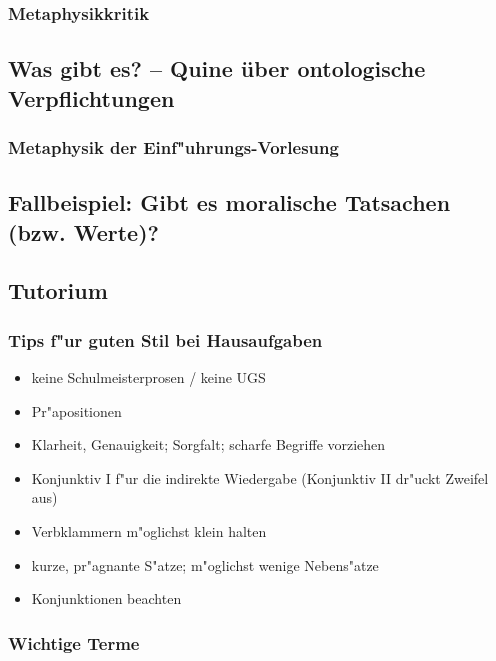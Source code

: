 \documentclass[]{scrartcl}
\begin{document}
\subsubsection{Metaphysikkritik}


\subsection{Was gibt es? -- Quine über ontologische Verpflichtungen}


\subsubsection{Metaphysik der Einf"uhrungs-Vorlesung}



\subsection{Fallbeispiel: Gibt es moralische Tatsachen (bzw. Werte)?}

\subsection{Tutorium}
\subsubsection{Tips f"ur guten Stil bei Hausaufgaben}

\begin{itemize}
  \item keine Schulmeisterprosen / keine UGS
  \item Pr"apositionen
  \item Klarheit, Genauigkeit; Sorgfalt; scharfe Begriffe vorziehen
  \item Konjunktiv I f"ur die indirekte Wiedergabe (Konjunktiv II dr"uckt Zweifel aus)
  \item Verbklammern m"oglichst klein halten
  \item kurze, pr"agnante S"atze; m"oglichst wenige Nebens"atze
  \item Konjunktionen beachten
\end{itemize}

\subsubsection{Wichtige Terme}
\end{document}
